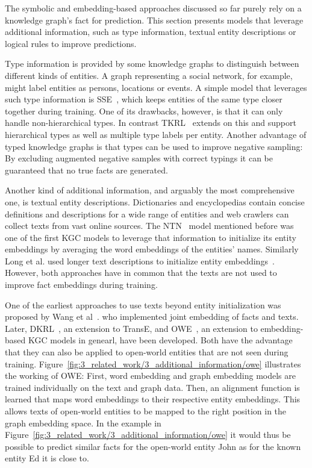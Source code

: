 The symbolic and embedding-based approaches discussed so far purely rely on a knowledge graph's fact for prediction. This section presents models that leverage additional information, such as type information, textual entity descriptions or logical rules to improve predictions.

Type information is provided by some knowledge graphs to distinguish between different kinds of entities. A graph representing a social network, for example, might label entities as persons, locations or events. A simple model that leverages such type information is SSE~\cite{Guo2015SemanticallySK}, which keeps entities of the same type closer together during training. One of its drawbacks, however, is that it can only handle non-hierarchical types. In contrast TKRL~\cite{Xie2016RepresentationLO} extends on this and support hierarchical types as well as multiple type labels per entity. Another advantage of typed knowledge graphs is that types can be used to improve negative sampling: By excluding augmented negative samples with correct typings it can be guaranteed that no true facts are generated.

Another kind of additional information, and arguably the most comprehensive one, is textual entity descriptions. Dictionaries and encyclopedias contain concise definitions and descriptions for a wide range of entities and web crawlers can collect texts from vast online sources. The NTN~\cite{Socher2013ReasoningWN} model mentioned before was one of the first KGC models to leverage that information to initialize its entity embeddings by averaging the word embeddings of the entities' names. Similarly Long et al. used longer text descriptions to initialize entity embeddings~\cite{Long2016LeveragingLR}. However, both approaches have in common that the texts are not used to improve fact embeddings during training.

One of the earliest approaches to use texts beyond entity initialization was proposed by Wang et al~\cite{Wang2014KnowledgeGE}. who implemented joint embedding of facts and texts. Later, DKRL~\cite{Xie2016RepresentationLO}, an extension to TransE, and OWE~\cite{Shah2019AnOE}, an extension to embedding-based KGC models in genearl, have been developed. Both have the advantage that they can also be applied to open-world entities that are not seen during training. Figure~\ref{fig:3_related_work/3_additional_information/owe} illustrates the working of OWE: First, word embedding and graph embedding models are trained individually on the text and graph data. Then, an alignment function is learned that maps word embeddings to their respective entity embeddings. This allows texts of open-world entities to be mapped to the right position in the graph embedding space. In the example in Figure~\ref{fig:3_related_work/3_additional_information/owe} it would thus be possible to predict similar facts for the open-world entity John as for the known entity Ed it is close to.

